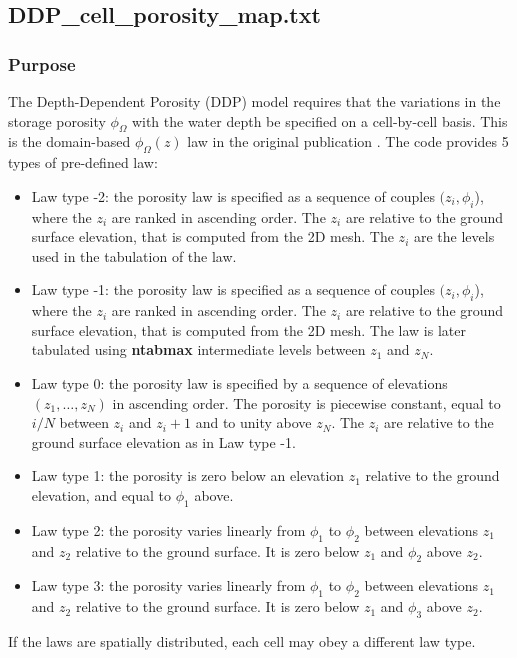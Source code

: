 \subsection{DDP\_cell\_porosity\_map.txt}
\label{sec_Model!Hyperbolic!DDP!cellPorosityMap}
\subsubsection{Purpose}
The Depth-Dependent Porosity (DDP) model requires that the variations in the storage porosity $\phi_\Omega$ with the water depth be specified on a cell-by-cell basis. This is the domain-based $\phi_\Omega(z)$ law in the original publication \cite{Guinot_al_2018}.
The code provides 5 types of pre-defined law:
\begin{itemize}
    \item Law type -2: the porosity law is specified as a sequence of couples $(z_i, \phi_i$), where the $z_i$ are ranked in ascending order. The $z_i$ are relative to the ground surface elevation, that is computed from the 2D mesh. The $z_i$ are the levels used in the tabulation of the law.
    \item Law type -1: the porosity law is specified as a sequence of couples $(z_i, \phi_i$), where the $z_i$ are ranked in ascending order. The $z_i$ are relative to the ground surface elevation, that is computed from the 2D mesh. The law is later tabulated using \textbf{ntabmax} intermediate levels between $z_1$ and $z_N$.
    \item Law type 0: the porosity law is specified by a sequence of elevations $(z_1, \ldots, z_N)$ in ascending order. The porosity is piecewise constant, equal to $i/N$ between $z_i$ and $z_i+1$ and to unity above $z_N$.  The $z_i$ are relative to the ground surface elevation as in Law type -1.
    \item Law type 1: the porosity is zero below an elevation $z_1$ relative to the ground elevation, and equal to $\phi_1$ above. 
    \item Law type 2: the porosity varies linearly from $\phi_1$ to $\phi_2$ between elevations $z_1$ and $z_2$ relative to the ground surface. It is zero below $z_1$ and $\phi_2$ above $z_2$.
    \item Law type 3: the porosity varies linearly from $\phi_1$ to $\phi_2$ between elevations $z_1$ and $z_2$ relative to the ground surface. It is zero below $z_1$ and $\phi_3$ above $z_2$.
\end{itemize}
If the laws are spatially distributed, each cell may obey a different law type.
%
